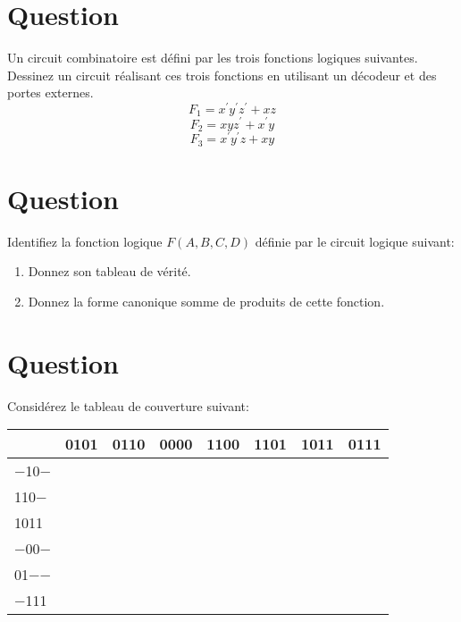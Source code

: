 \documentclass[letter, oneside]{book}
\begin{document}
\section*{Question}
\label{sec:orgab0dd56}
Un circuit combinatoire est défini par les trois fonctions logiques
  suivantes. Dessinez un circuit réalisant ces trois fonctions en
  utilisant un décodeur et des portes externes.
  $$
    F_1  = x^{\prime} y^{\prime} z^{\prime} + xz 
    $$
  $$
    F_2  = x y z^{\prime} + x^{\prime} y 
    $$
  $$
    F_3  = x^{\prime} y^{\prime} z + x y
    $$

\section*{Question}
\label{sec:org33d8709}
 Identifiez la fonction logique \(F(A,B,C,D)\) définie par le circuit
   logique suivant:
\begin{center}

\end{center}
\begin{enumerate}
\item Donnez son tableau de vérité.

\item Donnez la forme canonique somme de produits de cette fonction.
\end{enumerate}

\section*{Question}
\label{sec:orgaf2cfb1}
Considérez le tableau de couverture suivant:

\begin{center}
\begin{tabular}{lrrrrrrr}
 & 0101 & 0110 & 0000 & 1100 & 1101 & 1011 & 0111\\[0pt]
\hline
−10− &  &  &  &  &  &  & \\[0pt]
110− &  &  &  &  &  &  & \\[0pt]
1011 &  &  &  &  &  &  & \\[0pt]
−00− &  &  &  &  &  &  & \\[0pt]
01−− &  &  &  &  &  &  & \\[0pt]
−111 &  &  &  &  &  &  & \\[0pt]
\end{tabular}
\end{center}
\end{document}
